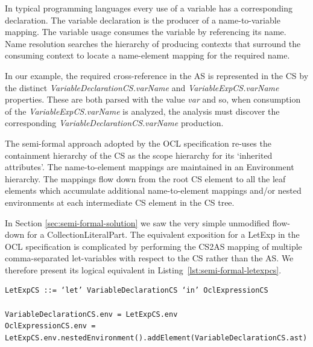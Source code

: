 \documentclass{llncs}
\begin{document}

In typical programming languages every use of a variable has a corresponding declaration. The variable declaration is the producer of a name-to-variable mapping. The variable usage consumes the variable by referencing its name. Name resolution searches the hierarchy of producing contexts that surround the consuming context to locate a name-element mapping for the required name.

In our example, the required cross-reference in the AS is represented in the CS by the distinct \emph{VariableDeclarationCS.varName} and \emph{VariableExpCS.varName} properties. These are both parsed with the value \emph{var} and so, when consumption of the \emph{VariableExpCS.varName} is analyzed, the analysis must discover the corresponding \emph{VariableDeclarationCS.varName} production.

The semi-formal approach adopted by the OCL specification re-uses the containment hierarchy of the CS as the scope hierarchy for its `inherited attributes'. The name-to-element mappings are maintained in an Environment hierarchy. The mappings flow down from the root CS element to all the leaf elements which accumulate additional name-to-element mappings and/or nested environments at each intermediate CS element in the CS tree.

In Section \ref{sec:semi-formal-solution} we saw the very simple unmodified flow-down for a CollectionLiteralPart. The equivalent exposition for a LetExp in the OCL specification is complicated by performing the CS2AS mapping of multiple comma-separated let-variables with respect to the CS rather than the AS. We therefore present its logical equivalent in Listing~\ref{lst:semi-formal-letexpcs}.

\begin{lstlisting}[caption=Semi-formal LetExpCS equivalent, label=lst:semi-formal-letexpcs, language=OCL]
LetExpCS ::= ‘let’ VariableDeclarationCS ‘in’ OclExpressionCS

VariableDeclarationCS.env = LetExpCS.env
OclExpressionCS.env = LetExpCS.env.nestedEnvironment().addElement(VariableDeclarationCS.ast)
\end{lstlisting}
\end{document}
